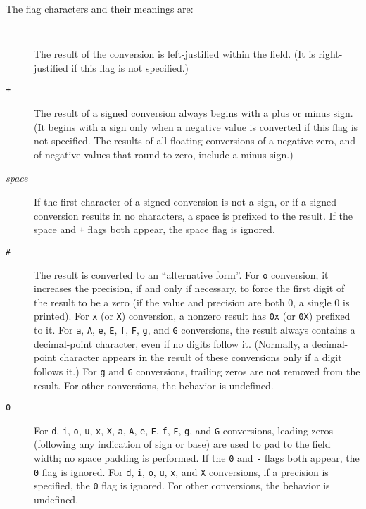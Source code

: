 The flag characters and their meanings are:
\begin{description}
	\item[\texttt{-}] The result of the conversion is left-justified within the
field. (It is right-justified if this flag is not specified.)
	\item[\texttt{+}] The result of a signed conversion always begins with a
plus or minus sign. (It begins with a sign only when a negative value is
converted if this flag is not specified. The results of all floating
conversions of a negative zero, and of negative values that round to zero,
include a minus sign.)
	\item[\emph{space}] If the first character of a signed conversion is not a
sign, or if a signed conversion results in no characters, a space is prefixed
to the result. If the space and \texttt{+} flags both appear, the space flag is
ignored.
	\item[\texttt{\#}] The result is converted to an ``alternative form''. For
\texttt{o} conversion, it increases the precision, if and only if necessary, to
force the first digit of the result to be a zero (if the value and precision
are both 0, a single 0 is printed). For \texttt{x} (or \texttt{X}) conversion,
a nonzero result has \texttt{0x} (or \texttt{0X}) prefixed to it. For
\texttt{a}, \texttt{A}, \texttt{e}, \texttt{E}, \texttt{f}, \texttt{F},
\texttt{g}, and \texttt{G} conversions, the result always contains a
decimal-point character, even if no digits follow it. (Normally, a
decimal-point character appears in the result of these conversions only if a
digit follows it.) For \texttt{g} and \texttt{G} conversions, trailing zeros
are not removed from the result. For other conversions, the behavior is
undefined.
	\item[\texttt{0}] For \texttt{d}, \texttt{i}, \texttt{o}, \texttt{u},
\texttt{x}, \texttt{X}, \texttt{a}, \texttt{A}, \texttt{e}, \texttt{E},
\texttt{f}, \texttt{F}, \texttt{g}, and \texttt{G} conversions, leading zeros
(following any indication of sign or base) are used to pad to the field width;
no space padding is performed. If the \texttt{0} and \texttt{-} flags both
appear, the \texttt{0} flag is ignored. For \texttt{d}, \texttt{i}, \texttt{o},
\texttt{u}, \texttt{x}, and \texttt{X} conversions, if a precision is
specified, the \texttt{0} flag is ignored. For other conversions, the behavior
is undefined.
\end{description}

